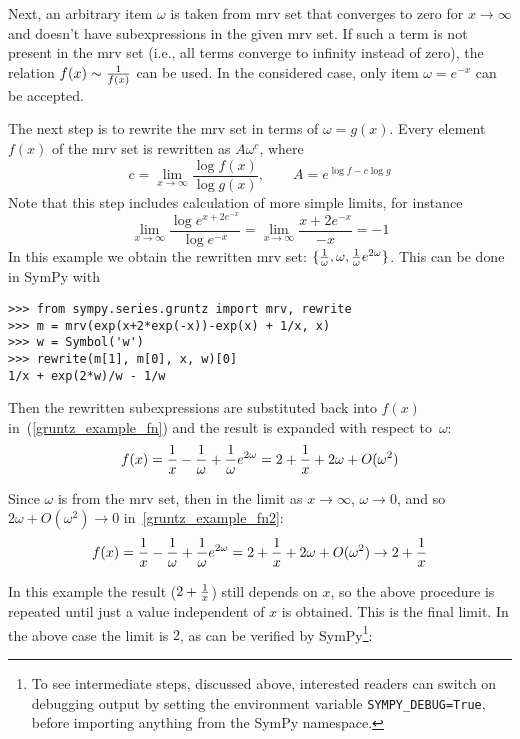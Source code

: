 Next, an arbitrary item $\omega$ is taken from mrv set that converges to zero for
$x\to\infty$ and doesn't have subexpressions in the given mrv set.  If such a term is not
present in the mrv set (i.e., all terms converge to infinity instead of zero),
the relation $f(x)\sim {1\over f(x)}$ can be used.  In the
considered case, only item $\omega=e^{-x}$ can be accepted.

The next step is to rewrite the mrv set in terms of $\omega=g(x)$.  Every element
$f(x)$ of the mrv set is rewritten as $A \omega^c$, where
\begin{equation}
\label{gruntz_rewrite}
c = \lim\limits_{x\to\infty} \frac{\log{f(x)}}{\log{g(x)}},
\qquad
A = e^{\log f - c \log g}
\end{equation}
Note that this step includes calculation of more simple limits, for instance
\begin{equation}
	\lim\limits_{x\to\infty} \frac{\log{e^{x + 2 e^{-x}}}}{\log e^{-x}}=
	\lim\limits_{x\to\infty} \frac{x + 2 e^{-x}}{-x} = -1
\end{equation}
In this example we obtain the rewritten mrv set: $\{{1\over\omega},
\omega, {1\over\omega}e^{2\omega}\}$. This can be done in SymPy with
\begin{verbatim}
>>> from sympy.series.gruntz import mrv, rewrite
>>> m = mrv(exp(x+2*exp(-x))-exp(x) + 1/x, x)
>>> w = Symbol('w')
>>> rewrite(m[1], m[0], x, w)[0]
1/x + exp(2*w)/w - 1/w
\end{verbatim}
Then the rewritten subexpressions are
substituted back into $f(x)$ in~(\ref{gruntz_example_fn})
and the result is expanded with respect to~$\omega$:
\begin{equation}
    \label{gruntz_example_fn2}
f(x) = {1\over x}-{1\over\omega}+{1\over\omega}e^{2\omega}
     = 2+{1\over x} + 2\omega + O(\omega^2)
\end{equation}

Since $\omega$ is from the mrv set, then in the limit as $x\to\infty$,
$\omega\to0$, and so $2\omega + O(\omega^2) \to 0$ in~\eqref{gruntz_example_fn2}:
\begin{equation}
f(x) = {1\over x}-{1\over\omega}+{1\over\omega}e^{2\omega}
    = 2+{1\over x} + 2\omega + O(\omega^2)
    \to 2 + {1\over x}
\end{equation}

In this example the result ($2+{1\over x}$) still depends on $x$, so the above procedure is
repeated until just a value independent of $x$ is obtained. This is the final
limit. In the above case the limit is $2$, as can be
verified by SymPy\footnote{To see intermediate steps, discussed above, interested
readers can switch on debugging output by setting
the environment variable \texttt{SYMPY\_DEBUG=True}, before importing anything from
the SymPy namespace.}:

